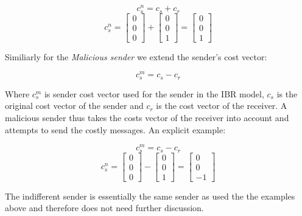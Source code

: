 \documentclass[10]{article}
\begin{document}
\begin{equation*}
c_s^n= c_s + c_r
\end{equation*}
\begin{equation*}
c_s^n=
\begin{bmatrix}
0 \\
0 \\
0
\end{bmatrix}
+
\begin{bmatrix}
0 \\
0 \\
1
\end{bmatrix}
=
\begin{bmatrix}
0 \\
0 \\
1
\end{bmatrix}
\end{equation*}

Similiarly for the \textit{Malicious sender} we extend the sender's cost vector:

\begin{equation*}
c_s^m= c_s - c_r
\end{equation*}

Where $c_s^m$ is sender cost vector used for the sender in the IBR model, $c_s$ is the original cost vector of the sender and $c_r$ is the cost vector of the receiver. A malicious sender thus takes the costs vector of the receiver into account and attempts to send the costly messages. An explicit example:

\begin{equation*}
c_s^m= c_s - c_r
\end{equation*}
\begin{equation*}
c_s^n=
\begin{bmatrix}
0 \\
0 \\
0
\end{bmatrix}
-
\begin{bmatrix}
0 \\
0 \\
1
\end{bmatrix}
=
\begin{bmatrix}
0 \\
0 \\
-1
\end{bmatrix}
\end{equation*}

The indifferent sender is essentially the same sender as used the the examples above and therefore does not need further discussion. \\
\end{document}
